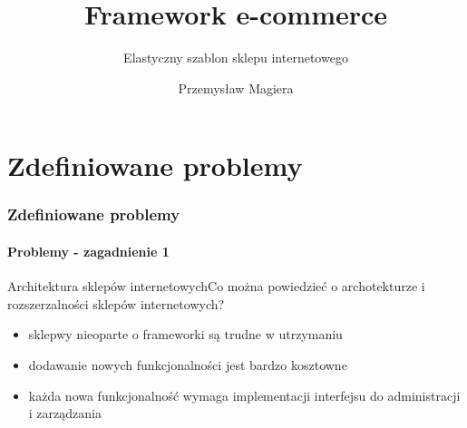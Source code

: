 \documentclass[polish,xcolor=table,9pt,aspectratio=1610,hyperref={pdfpagemode=FullScreen}]{beamer}
\title{Framework e-commerce}
\subtitle{Elastyczny szablon sklepu internetowego}
\author{Przemysław Magiera}
\begin{document}
\frame{\titlepage}

\part{Zdefiniowane problemy} %
\section{Zdefiniowane problemy}
%

\subsection{Problemy - zagadnienie 1}

\begin{frame}{Architektura sklepów internetowych}{Co można powiedzieć o archotekturze i rozszerzalności sklepów internetowych?}
\begin{itemize}
\item<1-> sklepwy nieoparte o frameworki są trudne w utrzymaniu %
\item<2-> dodawanie nowych funkcjonalności jest bardzo kosztowne  %
\item<3-> każda nowa funkcjonalność wymaga implementacji interfejsu do administracji i zarządzania
\end{itemize}
\end{frame}
\end{document}
